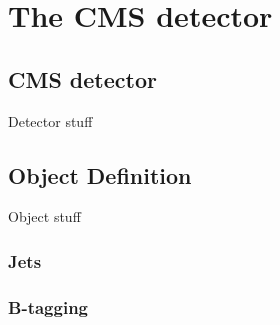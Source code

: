 \chapter{The CMS detector}
\label{chap:cmsoverview}


\section{CMS detector}
\label{sec:cmsdetector}

Detector stuff


\section{Object Definition}
\label{sec:cmsobjetcs}

Object stuff

\subsection{Jets}
\label{subsec:cmsobjects-jets}

\subsection{B-tagging}
\label{subsec:cmsobjects-btagging}

